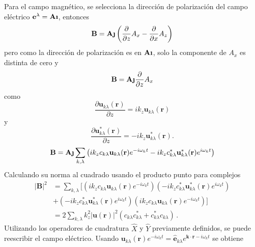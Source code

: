 Para el campo magnético, se selecciona la dirección de polarización del campo eléctrico
$\mathbf{e}^{\lambda}= \mathbf{\hat{\textnormal{\bfseries\i}}}$, entonces
\begin{equation*}
  \mathbf{B} = \mathbf{\hat{\textnormal{\bfseries\j}}} \left( \frac{\partial}{\partial z} A_x - \frac{\partial}{\partial x} A_z \right)
\end{equation*}
pero como la dirección de polarización es en $\mathbf{\hat{\textnormal{\bfseries\i}}}$, solo la componente de $A_x$ es distinta de cero y
\begin{equation*}
  \mathbf{B} = \mathbf{\hat{\textnormal{\bfseries\j}}} \frac{\partial}{\partial z} A_x
\end{equation*}
como
\begin{equation*}
  \frac{\partial \mathbf{u}_{k\lambda}(\mathbf{r})}{\partial z} = i k_z \mathbf{u}_{k\lambda}(\mathbf{r})
\end{equation*}
y
\begin{equation*}
  \frac{\partial \mathbf{u}^{*}_{k\lambda}(\mathbf{r})}{\partial z} = -i k_z \mathbf{u}^{*}_{k\lambda}(\mathbf{r}).
\end{equation*}
\begin{equation*}
  \mathbf{B} = \mathbf{\hat{\textnormal{\bfseries\j}}} \sum_{k,\lambda} \left( i k_z c_{k\lambda} \mathbf{u}_{k\lambda}(\mathbf{r})e^{-i\omega_{k} t} - i k_z c_{k\lambda}^* \mathbf{u}_{k\lambda}^*(\mathbf{r})e^{i\omega_{k} t}  \right)
\end{equation*}
Calculando su norma al cuadrado usando el producto punto para complejos
\begin{align*}
  |\mathbf{B}|^2 & = \sum_{k,\lambda} \Big[ \left(ik_z c_{k\lambda} \mathbf{u}_{k\lambda}(\mathbf{r})e^{-i\omega_{k} t}\right)\left(-ik_z c_{k\lambda}^{*} \mathbf{u}_{k\lambda}^*(\mathbf{r})e^{i\omega_{k} t} \right) \\
                 & + \left(-ik_z c_{k\lambda}^{*} \mathbf{u}_{k\lambda}^*(\mathbf{r})e^{i\omega_{k} t} \right)  \left(ik_z c_{k\lambda} \mathbf{u}_{k\lambda}(\mathbf{r})e^{-i\omega_{k} t}\right) \Big]                \\
                 & = 2 \sum_{k,\lambda} k_z^2 |\mathbf{u}(\mathbf{r})|^2 \left( c_{k\lambda} c_{k\lambda}^* + c_{k\lambda}^* c_{k\lambda} \right) \,.
\end{align*}
Utilizando los operadores de cuadratura $\hat{X}$ y $\hat{Y}$ previamente definidos, se puede reescribir el campo eléctrico. Usando $\mathbf{u}_{k\lambda}(\mathbf{r})e^{-i\omega_k t} = \hat{\mathbf{e}}_{k\lambda} e^{\mathbf{k}\cdot\mathbf{r}-i\omega_k t}$ se obtiene

